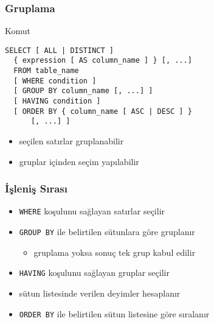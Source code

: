 \documentclass[dvipsnames]{beamer}
\theoremstyle{definition}
\theoremstyle{example}
\theoremstyle{plain}
\begin{document}
\begin{frame}[fragile]
  \frametitle{Gruplama}

  \begin{block}{Komut}
    \begin{lstlisting}
SELECT [ ALL | DISTINCT ]
  { expression [ AS column_name ] } [, ...]
  FROM table_name
  [ WHERE condition ]
  [ GROUP BY column_name [, ...] ]
  [ HAVING condition ]
  [ ORDER BY { column_name [ ASC | DESC ] }
      [, ...] ]
    \end{lstlisting}
  \end{block}

  \pause
  \begin{itemize}
    \item seçilen satırlar gruplanabilir
    \item gruplar içinden seçim yapılabilir
  \end{itemize}
\end{frame}

\begin{frame}
  \frametitle{İşleniş Sırası}

  \begin{itemize}
    \item \lstinline!WHERE! koşulunu sağlayan satırlar seçilir

    \pause
    \item \lstinline!GROUP BY! ile belirtilen sütunlara göre gruplanır
    \begin{itemize}
      \item gruplama yoksa sonuç tek grup kabul edilir
    \end{itemize}

    \pause
    \item \lstinline!HAVING! koşulunu sağlayan gruplar seçilir

    \pause
    \item sütun listesinde verilen deyimler hesaplanır

    \pause
    \item \lstinline!ORDER BY! ile belirtilen sütun listesine göre sıralanır
  \end{itemize}
\end{frame}
\end{document}
